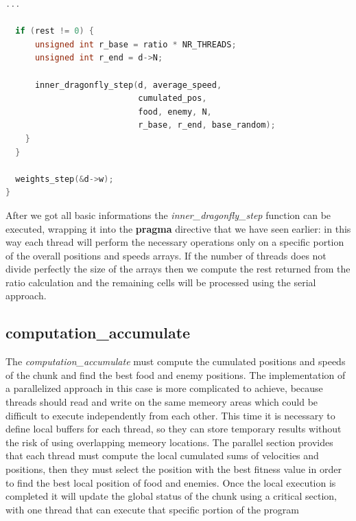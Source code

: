 \documentclass[10pt]{article}
\begin{document}
\begin{multicols}{2}
\begin{itemize}
\begin{lstlisting}[language=C,caption={parallelized dragonfly-compute-step}]
  ...

  if (rest != 0) {
      unsigned int r_base = ratio * NR_THREADS;
      unsigned int r_end = d->N;

      inner_dragonfly_step(d, average_speed, 
                           cumulated_pos, 
                           food, enemy, N,
                           r_base, r_end, base_random);
    }
  }

  weights_step(&d->w);
}

\end{lstlisting}


\noindent After we got all basic informations the \textit{inner\_dragonfly\_step}
function can be executed, wrapping it into the \textbf{pragma} directive that we have seen earlier: in this way each thread will 
perform the necessary operations only on a specific portion of the overall positions and speeds arrays.
If the number of threads does not divide perfectly the size of the arrays then we compute the rest
returned from the ratio calculation and the remaining cells will be processed using the serial approach.

\subsection*{computation\_accumulate}

The \textit{computation\_accumulate}  must compute
the cumulated positions and speeds of the chunk and find the best food and enemy positions.
The implementation of a parallelized approach in this case  is more complicated to achieve, 
because threads should read and write on the same memeory areas which could be 
difficult to execute independently from each other. This time it is necessary to define
local buffers for each thread, so they can store temporary results without the risk of using
overlapping memeory locations. The parallel section provides that each thread must compute the local
cumulated sums of velocities and positions, then they must select the position with the best fitness value
in order to find the best local position of food and enemies. Once the local execution is completed
it will update the global status of the chunk using a critical section, with one thread that can execute that
specific portion of the program


\end{itemize}
\end{multicols}
\end{document}
